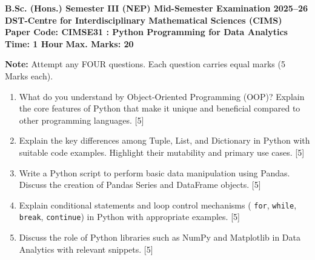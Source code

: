 \documentclass[11pt,a4paper]{article}
\begin{document}
\begin{center}
    {\Large   \textbf{B.Sc. (Hons.) Semester III (NEP) Mid-Semester Examination 2025--26}}\\[4pt]
    {\large   \textbf{DST-Centre for Interdisciplinary Mathematical Sciences (CIMS)}}\\[4pt]
   \textbf{Paper Code: CIMSE31 : Python Programming for Data Analytics}\\[6pt]
   \textbf{Time: 1 Hour} \hfill   \textbf{Max. Marks: 20}
\end{center}
\hr




\noindent   \textbf{Note:} Attempt any FOUR questions. Each question carries equal marks (5 Marks each).


\begin{enumerate}[label=   \textbf{\arabic*.}]
    \item What do you understand by Object-Oriented Programming (OOP)? Explain the core features of Python that make it unique and beneficial compared to other programming languages. \hfill [5]
    \item Explain the key differences among Tuple, List, and Dictionary in Python with suitable code examples. Highlight their mutability and primary use cases. \hfill [5]
    \item Write a Python script to perform basic data manipulation using Pandas. Discuss the creation of Pandas Series and DataFrame objects. \hfill [5]
    \item Explain conditional statements and loop control mechanisms (   \texttt{for},   \texttt{while},   \texttt{break},   \texttt{continue}) in Python with appropriate examples. \hfill [5]
    \item Discuss the role of Python libraries such as NumPy and Matplotlib in Data Analytics with relevant snippets. \hfill [5]
\end{enumerate}
\end{document}

